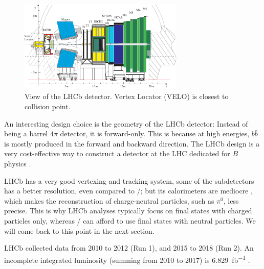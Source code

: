 \begin{figure}[ht]
    \centering
    \includegraphics[width=0.7\textwidth]{figs/lhcb_detector_view.pdf}
    \caption{
        View of the LHCb detector.
        Vertex Locator (VELO) is closest to collision point.
    }
    \label{fig:lhcb_detector_view}
\end{figure}

An interesting design choice is the geometry of the LHCb detector:
Instead of being a barrel $4\pi$ detector, it is forward-only.
This is because at high energies, $b\bar{b}$ is mostly produced in the forward
and backward direction.
The LHCb design is a very cost-effective way to construct a detector at the LHC
dedicated for $B$ physics \cite{LHCb:2008}.

LHCb has a very good vertexing and tracking system, some of the subdetectors has
a better resolution, even compared to \BaBar/;
but its calorimeters are mediocre \cite{LHCb:2008,Guz:2017}, which makes the
reconstruction of charge-neutral particles, such as $\pi^0$, less precise.
This is why LHCb analyses typically focus on final states with charged particles
only, whereas \BaBar/ can afford to use final states with neutral particles.
We will come back to this point in the next section.

LHCb collected data from 2010 to 2012 (Run 1), and 2015 to 2018 (Run 2).
An incomplete integrated luminosity (summing from 2010 to 2017) is
\SI{6.829}{fb^{-1}} \cite{LHCb-Facts:2019}.


